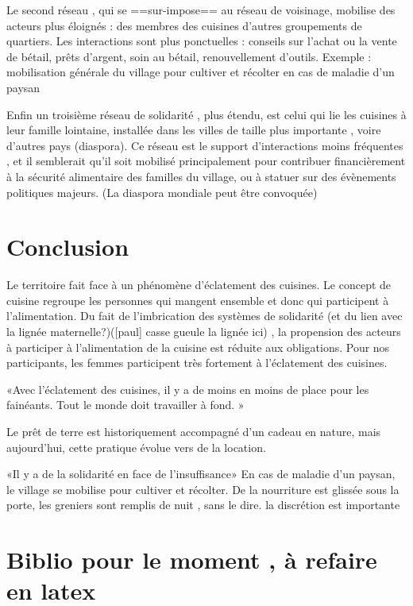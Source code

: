 Le second réseau , qui se ==sur-impose== au réseau de voisinage,  mobilise des acteurs plus éloignés : des  membres des cuisines d'autres groupements de quartiers. 
Les interactions sont plus ponctuelles : conseils sur l'achat ou la vente de bétail, prêts d'argent, soin au bétail, renouvellement d'outils. Exemple : mobilisation générale du village pour cultiver et récolter en cas de maladie d'un paysan 


Enfin un troisième réseau de solidarité , plus étendu, est celui qui lie les cuisines à leur famille lointaine, installée dans les villes  de taille plus importante , voire d'autres pays (diaspora).
Ce réseau est le support d'interactions  moins fréquentes , et il semblerait qu'il soit mobilisé principalement pour contribuer financièrement à la sécurité alimentaire des familles du village, ou à statuer sur des évènements politiques majeurs. (La diaspora mondiale peut être convoquée)

\section{Conclusion}

Le territoire fait face à un phénomène d’éclatement des cuisines. Le concept de cuisine regroupe les personnes qui mangent ensemble et donc qui participent à l’alimentation. Du fait de l’imbrication des systèmes de solidarité (et du lien avec la lignée maternelle?)([paul] casse gueule la lignée ici) , la propension des acteurs à participer à l’alimentation de la cuisine est réduite aux obligations. Pour nos participants, les femmes participent très fortement à l’éclatement des cuisines.

«Avec l’éclatement des cuisines, il y a de moins en moins de place pour les fainéants. Tout le monde doit travailler à fond. »


Le prêt de terre est historiquement accompagné d’un cadeau en nature, mais aujourd’hui, cette pratique évolue vers de la location.

«Il y a de la solidarité en face de l’insuffisance»
En cas de maladie d’un paysan, le village se mobilise pour cultiver et récolter.
De la nourriture est glissée sous la porte, les greniers sont remplis de nuit , sans le dire.
la discrétion est importante


\section{Biblio pour le moment , à refaire en latex}

